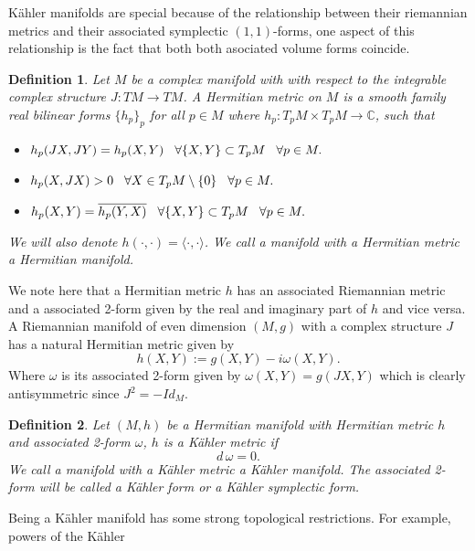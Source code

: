 \documentclass[letterpaper]{book}
\newtheorem{definition}{Definition}[section]
\newcommand{\co}{\ensuremath{\mathbb C }}
\begin{document}
Kähler manifolds are special because of the relationship between their riemannian metrics and their associated symplectic $(1,1)$-forms, one aspect of this relationship is the fact that both both asociated volume forms coincide.
\begin{definition}
        Let $M$ be a complex manifold with with respect to the integrable complex structure
        $J:TM\rightarrow TM$. A \textit{Hermitian metric} on $M$ is a smooth family
        real bilinear forms $\lbrace h_p\rbrace_p$ for all $p\in M$ where
        $h_p:T_pM\times T_pM\rightarrow\co$, such that
\begin{itemize}
        \item $h_p(JX,JY)=h_p(X,Y)\hspace{0.3cm}\forall\lbrace X,Y\rbrace\subset T_pM\hspace{0.3cm}\forall p\in M.$
        \item $h_p(X,JX)>0\hspace{0.3cm}\forall X\in T_p M\setminus\lbrace 0\rbrace\hspace{0.3cm}\forall p\in M.$
        \item $h_p(X,Y)=\overline{h_p(Y,X)}\hspace{0.3cm}\forall\lbrace X,Y\rbrace\subset T_pM\hspace{0.3cm}\forall p\in M.$
\end{itemize}
We will also denote
$h(\cdot,\cdot)=\langle\cdot,\cdot\rangle$. We call a manifold with a Hermitian
metric a \textit{Hermitian manifold}.
\end{definition}
We note here that a Hermitian metric $h$ has an associated Riemannian metric and a associated 2-form given by the real and
imaginary part of $h$ and vice versa. A Riemannian manifold of even dimension $(M,g)$ with a complex structure $J$ has
a natural Hermitian metric given by $$h(X,Y):=g(X,Y)-i\omega(X,Y).$$
Where $\omega$ is its associated 2-form given by $\omega(X,Y)=g(JX,Y)$ which is clearly antisymmetric since $J^2=-Id_M$.
\begin{definition}
        Let $(M,h)$ be a Hermitian manifold with Hermitian metric
        $h$ and associated 2-form $\omega$, $h$ is a Kähler metric if
        $$d\,\omega=0.$$ We call a manifold with a Kähler metric a \textit{Kähler manifold}.
        The associated 2-form will be called a \textit{Kähler form} or a
        \textit{Kähler symplectic form}.
\end{definition}
Being a Kähler manifold has some strong topological restrictions. For example, powers of the Kähler
\end{document}
